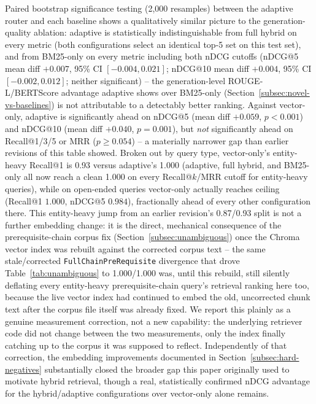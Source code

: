 \documentclass[a4paper,twoside]{article}
\begin{document}
Paired bootstrap significance testing (2,000 resamples) between the adaptive router and each baseline shows a qualitatively similar picture to the generation-quality ablation: adaptive is statistically indistinguishable from full hybrid on every metric (both configurations select an identical top-5 set on this test set), and from BM25-only on every metric including both nDCG cutoffs (nDCG@5 mean diff $+0.007$, 95\% CI $[-0.004, 0.021]$; nDCG@10 mean diff $+0.004$, 95\% CI $[-0.002, 0.012]$; neither significant) -- the generation-level ROUGE-L/BERTScore advantage adaptive shows over BM25-only (Section~\ref{subsec:novel-vs-baselines}) is not attributable to a detectably better ranking. Against vector-only, adaptive is significantly ahead on nDCG@5 (mean diff $+0.059$, $p<0.001$) and nDCG@10 (mean diff $+0.040$, $p=0.001$), but \emph{not} significantly ahead on Recall@1/3/5 or MRR ($p\geq0.054$) -- a materially narrower gap than earlier revisions of this table showed. Broken out by query type, vector-only's entity-heavy Recall@1 is 0.93 versus adaptive's 1.000 (adaptive, full hybrid, and BM25-only all now reach a clean 1.000 on every Recall@$k$/MRR cutoff for entity-heavy queries), while on open-ended queries vector-only actually reaches ceiling (Recall@1 $1.000$, nDCG@5 $0.984$), fractionally ahead of every other configuration there. This entity-heavy jump from an earlier revision's 0.87/0.93 split is not a further embedding change: it is the direct, mechanical consequence of the prerequisite-chain corpus fix (Section~\ref{subsec:unambiguous}) once the Chroma vector index was rebuilt against the corrected corpus text -- the same stale/corrected \texttt{FullChainPreRequisite} divergence that drove Table~\ref{tab:unambiguous} to 1.000/1.000 was, until this rebuild, still silently deflating every entity-heavy prerequisite-chain query's retrieval ranking here too, because the live vector index had continued to embed the old, uncorrected chunk text after the corpus file itself was already fixed. We report this plainly as a genuine measurement correction, not a new capability: the underlying retriever code did not change between the two measurements, only the index finally catching up to the corpus it was supposed to reflect. Independently of that correction, the embedding improvements documented in Section~\ref{subsec:hard-negatives} substantially closed the broader gap this paper originally used to motivate hybrid retrieval, though a real, statistically confirmed nDCG advantage for the hybrid/adaptive configurations over vector-only alone remains.
\end{document}
